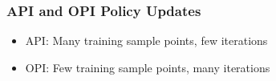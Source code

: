 \documentclass{beamer}
\begin{document}
\begin{frame}
\frametitle{API and OPI Policy Updates}
\begin{itemize}
\item API: Many training sample points, few iterations
\item OPI: Few training sample points, many iterations

\end{itemize}
\end{frame}
\end{document}
